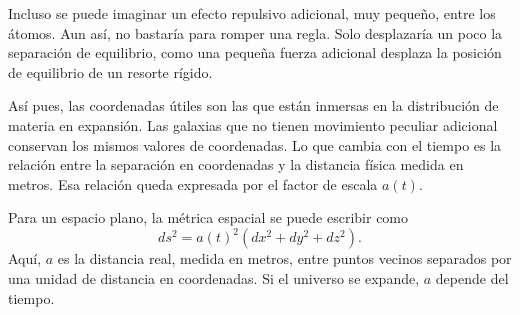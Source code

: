 \begin{classroomqa}
\end{classroomqa}

Incluso se puede imaginar un efecto repulsivo adicional, muy pequeño, entre los átomos. Aun así, no bastaría para romper una regla. Solo desplazaría un poco la separación de equilibrio, como una pequeña fuerza adicional desplaza la posición de equilibrio de un resorte rígido.

\begin{classroomqa}
\end{classroomqa}

Así pues, las coordenadas útiles son las que están inmersas en la distribución de materia en expansión. Las galaxias que no tienen movimiento peculiar adicional conservan los mismos valores de coordenadas. Lo que cambia con el tiempo es la relación entre la separación en coordenadas y la distancia física medida en metros. Esa relación queda expresada por el factor de escala \(a(t)\).

Para un espacio plano, la métrica espacial se puede escribir como
\begin{equation}
ds^2 = a(t)^2\left(dx^2+dy^2+dz^2\right).
\end{equation}
Aquí, \(a\) es la distancia real, medida en metros, entre puntos vecinos separados por una unidad de distancia en coordenadas. Si el universo se expande, \(a\) depende del tiempo.

